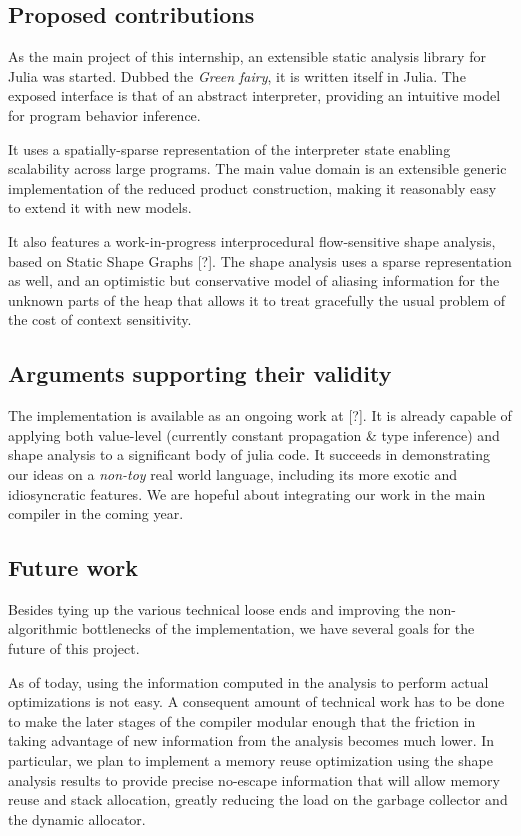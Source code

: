 \documentclass[11pt]{article}
\begin{document}
\subsection*{Proposed contributions}

As the main project of this internship, an extensible static analysis library for Julia was started. Dubbed the \emph{Green fairy}, it is written itself in Julia. The exposed interface is that of an abstract interpreter, providing an intuitive model for program behavior inference.

It uses a spatially-sparse representation of the interpreter state enabling scalability across large programs. The main value domain is an extensible generic implementation of the reduced product construction, making it reasonably easy to extend it with new models.

It also features a work-in-progress interprocedural flow-sensitive shape analysis, based on Static Shape Graphs [?]. The shape analysis uses a sparse representation as well, and an optimistic but conservative model of aliasing information for the unknown parts of the heap that allows it to treat gracefully the usual problem of the cost of context sensitivity.

\subsection*{Arguments supporting their validity}

The implementation is available as an ongoing work at [?]. It is already capable of applying both value-level (currently constant propagation \& type inference) and shape analysis to a significant body of julia code.
It succeeds in demonstrating our ideas on a \emph{non-toy} real world language, including its more exotic and idiosyncratic features.
We are hopeful about integrating our work in the main compiler in the coming year.

\subsection*{Future work}

Besides tying up the various technical loose ends and improving the non-algorithmic bottlenecks of the implementation, we have several goals for the future of this project.

As of today, using the information computed in the analysis to perform actual optimizations is not easy.
A consequent amount of technical work has to be done to make the later stages of the compiler modular enough that the friction in taking advantage of new information from the analysis becomes much lower. In particular, we plan to implement a memory reuse optimization using the shape analysis results to provide precise no-escape information that will allow memory reuse and stack allocation, greatly reducing the load on the garbage collector and the dynamic allocator.
\end{document}
